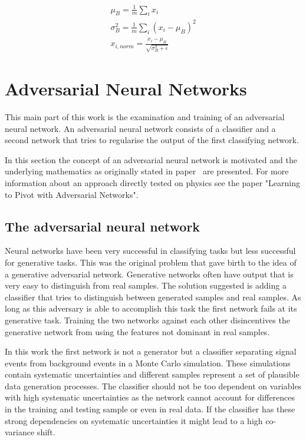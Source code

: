 \begin{align}
    \mu_B = \frac{1}{m} \sum_i x_i\\
    \sigma_B^2 = \frac{1}{m} \sum_i (x_i - \mu_B)^2\\
    x_{i,norm} = \frac{x_i - \mu_B}{\sqrt{\sigma_B^2 + \epsilon}}
\end{align}





\section{Adversarial Neural Networks}

This main part of this work is the examination and training of an adversarial neural network. An adversarial neural network consists of a classifier and a second network that tries to regularise the output of the first classifying network.

In this section the concept of an adversarial neural network is motivated and the underlying mathematics as originally stated in paper~\cite{2014arXiv1406.2661G} are presented.
For more information about an approach directly tested on physics see the paper "Learning to Pivot with Adversarial Networks".~\cite{Louppe:2016ylz}

\subsection{The adversarial neural network}

Neural networks have been very successful in classifying tasks but less successful for generative tasks. This was the original problem that gave birth to the idea of a generative adversarial network. Generative networks often have output that is very easy to distinguish from real samples. The solution suggested is adding a classifier that tries to distinguish between generated samples and real samples. As long as this adversary is able to accomplish this task the first network fails at its generative task. Training the two networks against each other disincentives the generative network from using the features not dominant in real samples.

In this work the first network is not a generator but a classifier separating signal events from background events in a Monte Carlo simulation. These simulations contain systematic uncertainties and different samples represent a set of plausible data generation processes. The classifier should not be too dependent on variables with high systematic uncertainties as the network cannot account for differences in the training and testing sample or even in real data. If the classifier has these strong dependencies on systematic uncertainties it might lead to a high co-variance shift.

